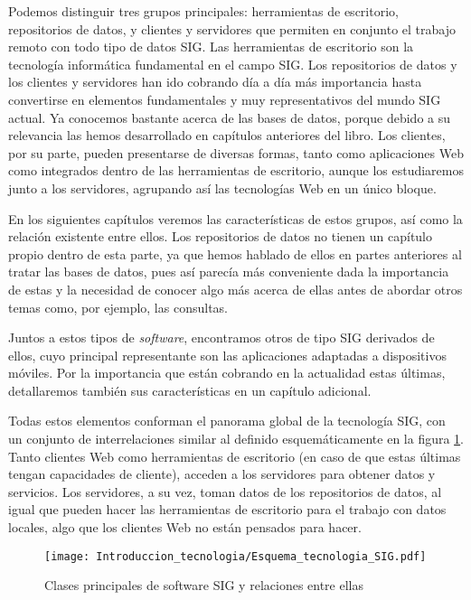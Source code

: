 Podemos distinguir tres grupos principales: herramientas de escritorio, repositorios de datos, y clientes y servidores que permiten en conjunto el trabajo remoto con todo tipo de datos SIG. Las herramientas de escritorio son la tecnología informática fundamental en el campo SIG. Los repositorios de datos y los clientes y servidores han ido cobrando día a día más importancia hasta convertirse en elementos fundamentales y muy representativos del mundo SIG actual. Ya conocemos bastante acerca de las bases de datos, porque debido a su relevancia las hemos desarrollado en capítulos anteriores del libro. Los clientes, por su parte, pueden presentarse de diversas formas, tanto como aplicaciones Web como integrados dentro de las herramientas de escritorio, aunque los estudiaremos junto a los servidores, agrupando así las tecnologías Web en un único bloque.

En los siguientes capítulos veremos las características de estos grupos, así como la relación existente entre ellos. Los repositorios de datos no tienen un capítulo propio dentro de esta parte, ya que hemos hablado de ellos en partes anteriores al tratar las bases de datos, pues así parecía más conveniente dada la importancia de estas y la necesidad de conocer algo más acerca de ellas antes de abordar otros temas como, por ejemplo, las consultas.

Juntos a estos tipos de \emph{software}, encontramos otros de tipo SIG derivados de ellos, cuyo principal representante son las aplicaciones adaptadas a dispositivos móviles. Por la importancia que están cobrando en la actualidad estas últimas, detallaremos también sus características en un capítulo adicional.

Todas estos elementos conforman el panorama global de la tecnología SIG, con un conjunto de interrelaciones similar al definido esquemáticamente en la figura \ref{Fig:Esquema_tecnologia_SIG}. Tanto clientes Web como herramientas de escritorio (en caso de que estas últimas tengan capacidades de cliente), acceden a los servidores para obtener datos y servicios. Los servidores, a su vez, toman datos de los repositorios de datos, al igual que pueden hacer las herramientas de escritorio para el trabajo con datos locales, algo que los clientes Web no están pensados para hacer.

\begin{figure}[!hbt]
\centering
\texttt{[image: Introduccion\_tecnologia/Esquema\_tecnologia\_SIG.pdf]}
\caption{\small Clases principales de software SIG y relaciones entre ellas}
\label{Fig:Esquema_tecnologia_SIG} 
\end{figure}

